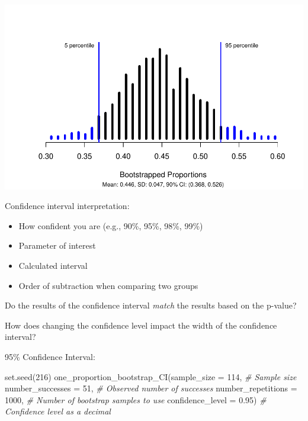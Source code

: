 \documentclass[
]{report}
\newenvironment{Shaded}{\begin{snugshade}}{\end{snugshade}}
\newcommand{\AttributeTok}[1]{\textcolor[rgb]{0.77,0.63,0.00}{#1}}
\newcommand{\CommentTok}[1]{\textcolor[rgb]{0.56,0.35,0.01}{\textit{#1}}}
\newcommand{\DecValTok}[1]{\textcolor[rgb]{0.00,0.00,0.81}{#1}}
\newcommand{\FloatTok}[1]{\textcolor[rgb]{0.00,0.00,0.81}{#1}}
\newcommand{\FunctionTok}[1]{\textcolor[rgb]{0.00,0.00,0.00}{#1}}
\newcommand{\NormalTok}[1]{#1}
\begin{document}
\begin{center}\includegraphics[width=0.7\linewidth]{06-LN06-1cat_simulation_files/figure-latex/unnamed-chunk-3-1} \end{center}

Confidence interval interpretation:

\begin{itemize}
\item
  How confident you are (e.g., 90\%, 95\%, 98\%, 99\%)
\item
  Parameter of interest
\item
  Calculated interval
\item
  Order of subtraction when comparing two groups
\end{itemize}

\vspace{0.8in}

Do the results of the confidence interval \emph{match} the results based on the p-value?

\vspace{0.5in}

How does changing the confidence level impact the width of the confidence interval?

95\% Confidence Interval:

\begin{Shaded}
\begin{Highlighting}[]
\FunctionTok{set.seed}\NormalTok{(}\DecValTok{216}\NormalTok{)}
\FunctionTok{one\_proportion\_bootstrap\_CI}\NormalTok{(}\AttributeTok{sample\_size =} \DecValTok{114}\NormalTok{, }\CommentTok{\# Sample size}
                    \AttributeTok{number\_successes =} \DecValTok{51}\NormalTok{, }\CommentTok{\# Observed number of successes}
                    \AttributeTok{number\_repetitions =} \DecValTok{1000}\NormalTok{, }\CommentTok{\# Number of bootstrap samples to use}
                    \AttributeTok{confidence\_level =} \FloatTok{0.95}\NormalTok{) }\CommentTok{\# Confidence level as a decimal}
\end{Highlighting}
\end{Shaded}
\end{document}

